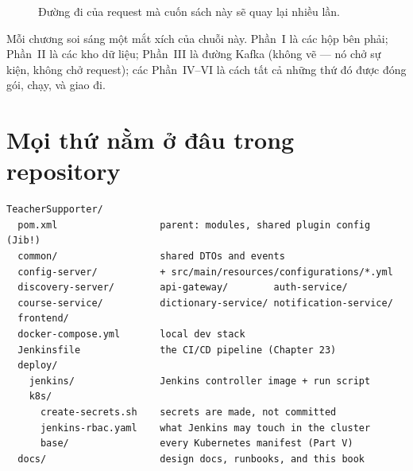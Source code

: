 \begin{figure}[h]
\centering
{}
\caption{Đường đi của request mà cuốn sách này sẽ quay lại nhiều lần.}
\end{figure}

Mỗi chương soi sáng một mắt xích của chuỗi này. Phần~I là các hộp bên
phải; Phần~II là các kho dữ liệu; Phần~III là đường Kafka (không vẽ ---
nó chở sự kiện, không chở request); các Phần~IV--VI là cách tất cả những
thứ đó được đóng gói, chạy, và giao đi.

\section*{Mọi thứ nằm ở đâu trong repository}

\begin{lstlisting}
TeacherSupporter/
  pom.xml                  parent: modules, shared plugin config (Jib!)
  common/                  shared DTOs and events
  config-server/           + src/main/resources/configurations/*.yml
  discovery-server/        api-gateway/        auth-service/
  course-service/          dictionary-service/ notification-service/
  frontend/
  docker-compose.yml       local dev stack
  Jenkinsfile              the CI/CD pipeline (Chapter 23)
  deploy/
    jenkins/               Jenkins controller image + run script
    k8s/
      create-secrets.sh    secrets are made, not committed
      jenkins-rbac.yaml    what Jenkins may touch in the cluster
      base/                every Kubernetes manifest (Part V)
  docs/                    design docs, runbooks, and this book
\end{lstlisting}

